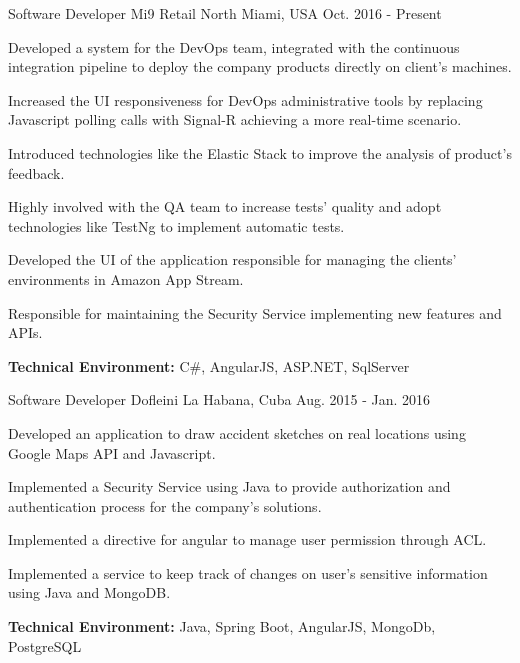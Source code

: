 
\begin{cventries}


\workexperienceentry
{Software Developer} %
{Mi9 Retail} %
{North Miami, USA} %
{Oct. 2016 - Present} %
{ %
\begin{cvitems}
    \item {Developed a system for the DevOps team, integrated with the continuous integration pipeline to deploy the company products directly on client's machines.}
    \item {Increased the UI responsiveness for DevOps administrative tools by replacing Javascript polling calls with Signal-R achieving a more real-time scenario.}
    \item {Introduced technologies like the Elastic Stack to improve the analysis of  product's feedback.}  
    \item {Highly involved with the QA team to increase tests' quality and adopt technologies like TestNg to implement automatic tests.}
    \item {Developed the UI of the application responsible for managing the clients' environments in Amazon App Stream.}
    \item {Responsible for maintaining the Security Service implementing new features and APIs.}
\end{cvitems}
}
{\textbf{Technical Environment:} C\#, AngularJS, ASP.NET, SqlServer}


\workexperienceentry
{Software Developer} %
{Dofleini} %
{La Habana, Cuba} %
{Aug. 2015 - Jan. 2016} %
{ %
\begin{cvitems}
	\item {Developed an application to draw accident sketches on real locations using Google Maps API and
		Javascript.}
	\item {Implemented a Security Service using Java to provide authorization and authentication
	process for the company's solutions.}
	\item {Implemented a directive for angular to manage user permission through ACL.}
	\item {Implemented a service to keep track of changes on user's sensitive information using Java and MongoDB.}
\end{cvitems}
}
{\textbf{Technical Environment:} Java, Spring Boot, AngularJS, MongoDb, PostgreSQL}



\end{cventries}
